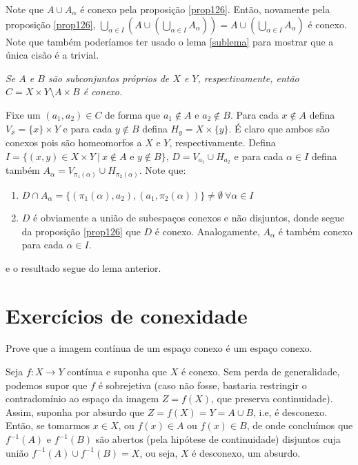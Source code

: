 \begin{demm}
Note que $A \cup A_\alpha$ é conexo pela proposição \cref{prop126}. Então, novamente pela proposição \cref{prop126}, $\displaystyle{\bigcup_{\alpha \in I}\left(A \cup  \left(\displaystyle{\bigcup_{\alpha \in I} A_\alpha} \right) \right)} = A \cup \left(\displaystyle{\bigcup_{\alpha \in I} A_\alpha} \right)$ é conexo. Note que também poderíamos ter usado o lema \cref{sublema} para mostrar que a única cisão é a trivial.
\end{demm}
\begin{lema}
\textit{Se $A$ e $B$ são subconjuntos próprios de $X$ e $Y$, respectivamente, então $C = X \times Y \setminus A \times B$ é conexo.}
\end{lema}
\begin{demm}
Fixe um $(a_1, a_2) \in C$ de forma que $a_1 \notin A$ e $a_2 \notin B$. Para cada $x \notin A$ defina $V_x = \{x\} \times Y$ e para cada $y \notin B$ defina $H_y = X \times \{y \}$. É claro que ambos são conexos pois são homeomorfos a $X$ e $Y$, respectivamente. Defina $I = \{(x, y) \in X \times Y \ \vert \ x \notin A \text{ e }y\notin B \}$, $D = V_{a_1} \cup H_{a_2}$ e para cada $\alpha \in I$ defina também $A_\alpha = V_{\pi_1(\alpha)} \cup H_{\pi_2(\alpha)}$. Note que:
\begin{enumerate}[label=\color{blue}{\textbf{(\roman*)}}]
    \item $D \cap A_\alpha =\{ (\pi_1(\alpha), a_2), (a_1, \pi_2(\alpha)) \} \neq \emptyset \ \forall \alpha \in I$
    \item $D$ é obviamente a união de subespaços conexos e não disjuntos, donde segue da proposição \cref{prop126} que $D$ é conexo. Analogamente, $A_\alpha$ é também conexo para cada $\alpha \in I$.
\end{enumerate}
e o resultado segue do lema anterior.
\end{demm}
\section{Exercícios de conexidade}
\begin{Mybox}
Prove que a imagem contínua de um espaço conexo é um espaço conexo.
\vspace{-.4cm}
\end{Mybox}
\vspace{-.5cm}
\begin{dem}
Seja $f: X \to Y$ contínua e suponha que $X$ é conexo. Sem perda de generalidade, podemos supor que $f$ é sobrejetiva (caso não fosse, bastaria restringir o contradomínio ao espaço da imagem $Z = f(X)$, que preserva continuidade). Assim, suponha por absurdo que $Z = f(X) = Y =  A \cup B$, i.e, é desconexo. Então, se tomarmos $x \in X$, ou $f(x) \in A$ ou $f(x) \in B$, de onde concluímos que $f^{-1}(A)$ e $f^{-1}(B)$ são abertos (pela hipótese de continuidade) disjuntos cuja união $f^{-1}(A) \cup f^{-1}(B) = X$, ou seja, $X$ é desconexo, um absurdo. 
\end{dem}

